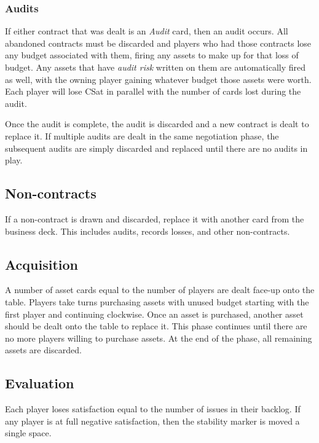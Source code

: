 \documentclass[twocolumn]{article}
\begin{document}
\subsubsection*{Audits}

If either contract that was dealt is an \emph{Audit} card, then an audit occurs. All abandoned contracts must be discarded and players who had those contracts lose any budget associated with them, firing any assets to make up for that loss of budget. Any assets that have \emph{audit risk} written on them are automatically fired as well, with the owning player gaining whatever budget those assets were worth. Each player will lose CSat in parallel with the number of cards lost during the audit.

Once the audit is complete, the audit is discarded and a new contract is dealt to replace it. If multiple audits are dealt in the same negotiation phase, the subsequent audits are simply discarded and replaced until there are no audits in play.

\subsection*{Non-contracts}

If a non-contract is drawn and discarded, replace it with another card from the business deck. This includes audits, records losses, and other non-contracts.

\subsection*{Acquisition}

A number of asset cards equal to the number of players are dealt face-up onto the table. Players take turns purchasing assets with unused budget starting with the first player and continuing clockwise. Once an asset is purchased, another asset should be dealt onto the table to replace it. This phase continues until there are no more players willing to purchase assets. At the end of the phase, all remaining assets are discarded.

\subsection*{Evaluation}

Each player loses satisfaction equal to the number of issues in their backlog. If any player is at full negative satisfaction, then the stability marker is moved a single space.
\end{document}
